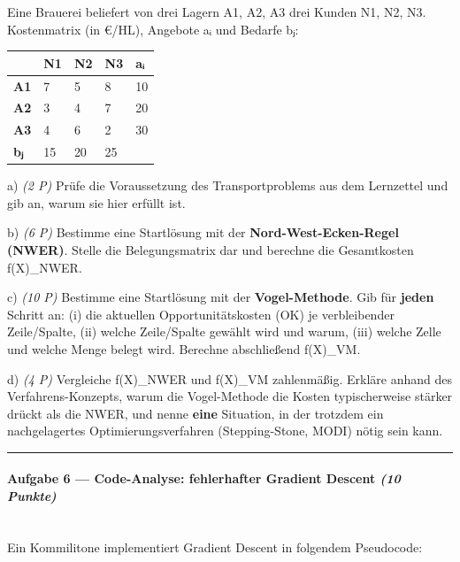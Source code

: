 \documentclass[11pt, a4paper]{article}
\begin{document}
Eine Brauerei beliefert von drei Lagern A1, A2, A3 drei Kunden N1, N2, N3. Kostenmatrix (in €/HL), Angebote aᵢ und Bedarfe bⱼ:



{\small
\begin{tabularx}{\linewidth}{XXXXX}
\hline
\rowcolor{tableheadbg}
{\color{white}\textbf{}} & {\color{white}\textbf{N1}} & {\color{white}\textbf{N2}} & {\color{white}\textbf{N3}} & {\color{white}\textbf{aᵢ}} \\[2pt]
\hline
\endhead
\hline
\endfoot
\textbf{A1} & 7 & 5 & 8 & 10 \\
\textbf{A2} & 3 & 4 & 7 & 20 \\
\textbf{A3} & 4 & 6 & 2 & 30 \\
\textbf{bⱼ} & 15 & 20 & 25 &  \\
\end{tabularx}
}


a) \textit{(2 P)} Prüfe die Voraussetzung des Transportproblems aus dem Lernzettel und gib an, warum sie hier erfüllt ist.


b) \textit{(6 P)} Bestimme eine Startlösung mit der \textbf{Nord-West-Ecken-Regel (NWER)}. Stelle die Belegungsmatrix dar und berechne die Gesamtkosten f(X)\_NWER.


c) \textit{(10 P)} Bestimme eine Startlösung mit der \textbf{Vogel-Methode}. Gib für \textbf{jeden} Schritt an: (i) die aktuellen Opportunitätskosten (OK) je verbleibender Zeile/Spalte, (ii) welche Zeile/Spalte gewählt wird und warum, (iii) welche Zelle und welche Menge belegt wird. Berechne abschließend f(X)\_VM.


d) \textit{(4 P)} Vergleiche f(X)\_NWER und f(X)\_VM zahlenmäßig. Erkläre anhand des Verfahrens-Konzepts, warum die Vogel-Methode die Kosten typischerweise stärker drückt als die NWER, und nenne \textbf{eine} Situation, in der trotzdem ein nachgelagertes Optimierungsverfahren (Stepping-Stone, MODI) nötig sein kann.



\noindent\textcolor{rulegray}{\rule{\linewidth}{0.4pt}}


\paragraph{Aufgabe 6 — Code-Analyse: fehlerhafter Gradient Descent \textit{(10 Punkte)}}\mbox{}\\[2pt]

Ein Kommilitone implementiert Gradient Descent in folgendem Pseudocode:
\end{document}
